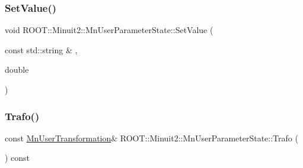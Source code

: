 \subsubsection{\texorpdfstring{SetValue()}{SetValue()}\hspace{0.1cm}{\footnotesize\ttfamily [4/4]}}
{\footnotesize\ttfamily void R\+O\+O\+T\+::\+Minuit2\+::\+Mn\+User\+Parameter\+State\+::\+Set\+Value (\begin{DoxyParamCaption}\item[{const std\+::string \&}]{,  }\item[{double}]{ }\end{DoxyParamCaption})}

\mbox{\label{classROOT_1_1Minuit2_1_1MnUserParameterState_a7184e94a20e923d68f1fb00ab5c549b2}} 
\subsubsection{\texorpdfstring{Trafo()}{Trafo()}\hspace{0.1cm}{\footnotesize\ttfamily [1/2]}}
{\footnotesize\ttfamily const \mbox{\hyperlink{classROOT_1_1Minuit2_1_1MnUserTransformation}{Mn\+User\+Transformation}}\& R\+O\+O\+T\+::\+Minuit2\+::\+Mn\+User\+Parameter\+State\+::\+Trafo (\begin{DoxyParamCaption}{ }\end{DoxyParamCaption}) const\hspace{0.3cm}{\ttfamily [inline]}}

